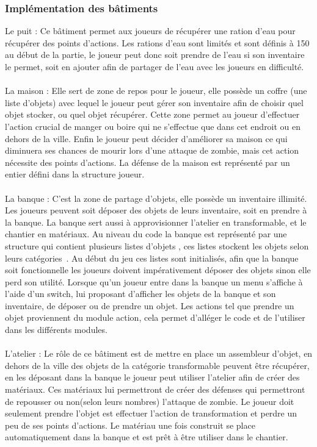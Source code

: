 \documentclass[a4paper,11pt]{article}
\begin{document}
\subsubsection{Implémentation des bâtiments}

Le puit : Ce bâtiment permet aux joueurs de récupérer une ration d'eau pour récupérer des points d'actions. Les rations d'eau sont limités et sont définis à 150 au début de la partie, le joueur peut donc soit prendre de l'eau si son inventaire le permet, soit en ajouter afin de partager de l'eau avec les joueurs en difficulté.
\\
\\
La maison : Elle sert de zone de repos pour le joueur, elle possède un coffre (une liste d'objets) avec lequel le joueur peut gérer son inventaire afin de choisir quel objet stocker, ou quel objet récupérer. Cette zone permet au joueur d'effectuer l'action crucial de manger ou boire qui ne s'effectue que dans cet endroit ou en dehors de la ville. Enfin le joueur peut décider d'améliorer sa maison ce qui diminuera ses chances de mourir lors d'une attaque de zombie, mais cet action nécessite des points d'actions. La défense de la maison est représenté par un entier défini dans la structure joueur.
\\
\\
La banque : C'est la zone de partage d'objets, elle possède un inventaire illimité. Les joueurs peuvent soit déposer des objets de leurs inventaire, soit en prendre à la banque. La banque sert aussi à approvisionner l'atelier en transformable, et le chantier en matériaux. Au niveau du code la banque est représenté par une structure qui contient plusieurs listes d'objets , ces listes stockent les objets selon leurs catégories . Au début du jeu ces listes sont initialisés, afin que la banque soit fonctionnelle les joueurs doivent impérativement déposer des objets sinon elle perd son utilité. Lorsque qu'un joueur entre dans la banque un menu s'affiche à l'aide d'un switch, lui proposant d'afficher les objets de la banque et son inventaire, de déposer ou de prendre un objet. Les actions tel que prendre un objet proviennent du module action, cela permet d'alléger le code et de l'utiliser dans les différents modules.
\\
\\
L'atelier : Le rôle de ce bâtiment est de mettre en place un assembleur d'objet, en dehors de la ville des objets de la catégorie transformable peuvent être récupérer, en les déposant dans la banque le joueur peut utiliser l'atelier afin de créer des matériaux. Ces matériaux lui permettront de créer des défenses qui permettront de repousser ou non(selon leurs nombres) l'attaque de zombie. Le joueur doit seulement prendre l'objet est effectuer l'action de transformation et perdre un peu de ses points d'actions. Le matériau une fois construit se place automatiquement dans la banque et est prêt à être utiliser dans le chantier.
\end{document}
